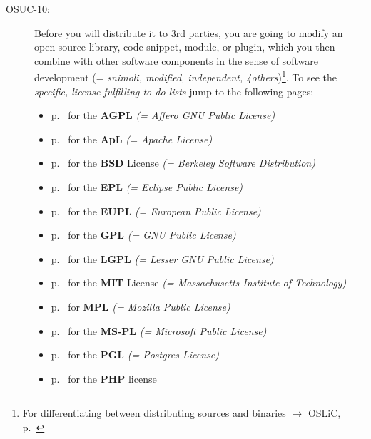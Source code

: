 \begin{description}
\item[OSUC-10:]\label{OSUC-10-DEF} Before you will distribute it to 3rd parties,
you are going to modify an open source library, code snippet, module, or plugin,
which you then combine with other software components in the sense of software
development (= \textit{snimoli, modified, independent, 4others})\footnote{For
differentiating between distributing sources and binaries $\rightarrow$ OSLiC,
p.\ \pageref{sec:SourceBinaryDifference}}. To see the \textit{specific, license
fulfilling to-do lists} jump to the following pages:
  \begin{itemize}
    \item p.\ \pageref{OSUC-10-AGPL} for the \textbf{AGPL}
      \textit{(= Affero GNU Public License)} 
    \item p.\ \pageref{OSUC-10-Apache20} for the \textbf{ApL}
      \textit{(= Apache License)}
    \item p.\ \pageref{OSUC-10-BSD} for the \textbf{BSD} License
      \textit{(= Berkeley Software Distribution)}
    \item p.\ \pageref{OSUC-10-EPL} for the \textbf{EPL}
      \textit{(= Eclipse Public License)}     
    \item p.\ \pageref{OSUC-10-EUPL} for the \textbf{EUPL}
      \textit{(= European Public License)} 
    \item p.\ \pageref{OSUC-10-GPL} for the \textbf{GPL}
       \textit{(= GNU Public License)} 
    \item p.\ \pageref{OSUC-10-LGPL} for the \textbf{LGPL}
      \textit{(= Lesser GNU Public License)}           
    \item p.\ \pageref{OSUC-10-MIT} for the \textbf{MIT} License
       \textit{(= Massachusetts Institute of Technology)} 
    \item p.\ \pageref{OSUC-10-MPL} for \textbf{MPL}
      \textit{(= Mozilla Public License)}     
    \item p.\ \pageref{OSUC-10-MS-PL} for the \textbf{MS-PL}
      \textit{(= Microsoft Public License)} 
    \item p.\ \pageref{OSUC-10-PGL} for the \textbf{PGL}
      \textit{(= Postgres License)} 
    \item p.\ \pageref{OSUC-10-PHP} for the \textbf{PHP} license 
  \end{itemize}

\end{description}

%
